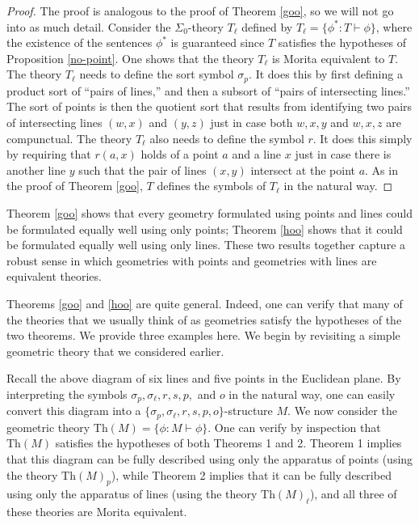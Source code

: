 \begin{proof}
  The proof is analogous to the proof of Theorem \ref{goo}, so we will
  not go into as much detail. Consider the $\Sigma_0$-theory $T_\ell$
  defined by $T_\ell=\{\phi^*: T\vdash\phi\}$, where the existence of
  the sentences $\phi^*$ is guaranteed since $T$ satisfies the
  hypotheses of Proposition \ref{no-point}. One shows that the theory
  $T_\ell$ is Morita equivalent to $T$. The theory $T_\ell$ needs to
  define the sort symbol $\sigma_p$. It does this by first defining a
  product sort of ``pairs of lines,'' and then a subsort of ``pairs of
  intersecting lines.'' The sort of points is then the quotient sort
  that results from identifying two pairs of intersecting lines
  $(w, x)$ and $(y,z)$ just in case both $w, x,y$ and $w,x,z$ are
  compunctual. The theory $T_\ell$ also needs to define the symbol
  $r$. It does this simply by requiring that $r(a,x)$ holds of a point
  $a$ and a line $x$ just in case there is another line $y$ such that
  the pair of lines $(x,y)$ intersect at the point $a$. As in the
  proof of Theorem \ref{goo}, $T$ defines the symbols of $T_\ell$ in
  the natural way.
\end{proof}

Theorem \ref{goo} shows that every geometry formulated using points
and lines could be formulated equally well using only points; Theorem
\ref{hoo} shows that it could be formulated equally well using only
lines. These two results together capture a robust sense in which
geometries with points and geometries with lines are equivalent
theories.

Theorems \ref{goo} and \ref{hoo} are quite general. Indeed, one can
verify that many of the theories that we usually think of as
geometries satisfy the hypotheses of the two theorems. We provide
three examples here. We begin by revisiting a simple geometric theory
that we considered earlier.

\begin{example}
  Recall the above diagram of six lines and five points in the
  Euclidean plane. By interpreting the symbols
  $\sigma_p, \sigma_\ell, r, s, p,$ and $o$ in the natural way, one
  can easily convert this diagram into a
  $\{\sigma_p, \sigma_\ell, r, s, p, o\}$-structure $M$. We now
  consider the geometric theory
  $\text{Th}(M)=\{\phi:M\vdash\phi\}$. One can verify by inspection
  that $\text{Th}(M)$ satisfies the hypotheses of both Theorems 1 and
  2. Theorem 1 implies that this diagram can be fully described using
  only the apparatus of points (using the theory $\text{Th}(M)_p$),
  while Theorem 2 implies that it can be fully described using only
  the apparatus of lines (using the theory $\text{Th}(M)_\ell$), and
  all three of these theories are Morita equivalent.
\end{example}


